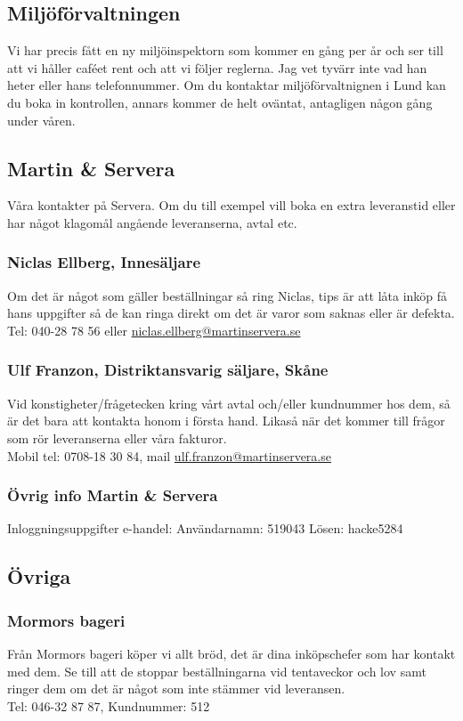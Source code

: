 \documentclass[10pt]{article}
\begin{document}
\subsection*{Miljöförvaltningen}
Vi har precis fått en ny miljöinspektorn som kommer en gång per år och ser till att vi håller caféet rent och att vi följer reglerna. Jag vet tyvärr inte vad han heter eller hans telefonnummer. Om du kontaktar miljöförvaltnignen i Lund kan du boka in kontrollen, annars kommer de helt oväntat, antagligen någon gång under våren.\\

\subsection*{Martin \& Servera}
Våra kontakter på Servera. Om du till exempel vill boka en extra leveranstid eller har något klagomål angående leveranserna, avtal etc.

\subsubsection*{Niclas Ellberg, Innesäljare}
Om det är något som gäller beställningar så ring Niclas, tips är att låta inköp få hans uppgifter så de kan ringa direkt om det är varor som saknas eller är defekta.\\
Tel: {040-28 78 56} eller \url{niclas.ellberg@martinservera.se}

\subsubsection*{Ulf Franzon, Distriktansvarig säljare, Skåne}
Vid konstigheter/frågetecken kring vårt avtal och/eller kundnummer hos dem, så är det bara att kontakta honom i första hand. Likaså när det kommer till frågor som rör leveranserna eller våra fakturor.\\
Mobil tel: {0708-18 30 84}, mail \url{ulf.franzon@martinservera.se}

\subsubsection*{Övrig info Martin \& Servera}
Inloggningsuppgifter e-handel: Användarnamn: {519043} Lösen: {hacke5284}

\subsection*{Övriga}
\subsubsection*{Mormors bageri}
Från Mormors bageri köper vi allt bröd, det är dina inköpschefer som har kontakt med dem. Se till att de stoppar beställningarna vid tentaveckor och lov samt ringer dem om det är något som inte stämmer vid leveransen.\\
Tel: {046-32 87 87}, Kundnummer: {512}
\end{document}
